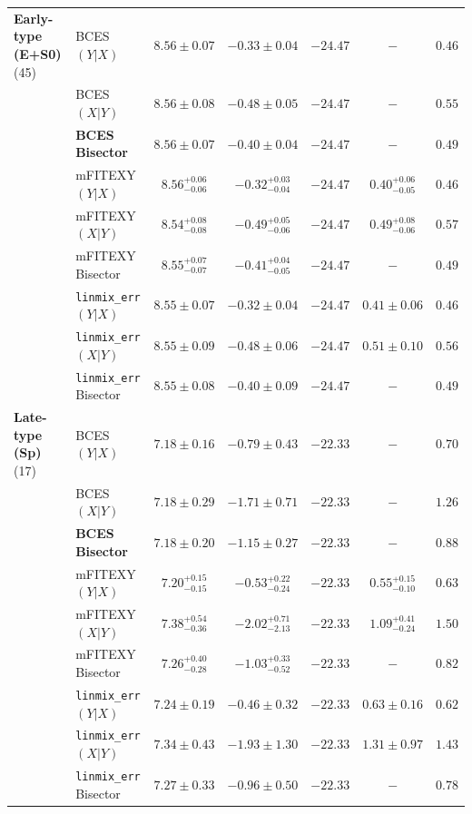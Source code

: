 \documentclass[preprint2]{emulateapj}
\begin{document}
\begin{table}
\begin{tabular}{llccccc}
{\bf Early-type (E+S0)} (45) & BCES $(Y|X)$    & $8.56 \pm 0.07$ & $-0.33 \pm 0.04$ & $-24.47$ & $-$    & $0.46$ \\
                             & BCES $(X|Y)$    & $8.56 \pm 0.08$ & $-0.48 \pm 0.05$ & $-24.47$ & $-$    & $0.55$ \\
                             & {\bf BCES Bisector}& $\boldsymbol{8.56 \pm 0.07}$ & $\boldsymbol{-0.40 \pm 0.04}$ & $\boldsymbol{-24.47}$ & $-$    & $\boldsymbol{0.49}$ \\
                             & mFITEXY $(Y|X)$ & $8.56^{+0.06}_{-0.06}$ & $-0.32^{+0.03}_{-0.04}$ & $-24.47$ & $0.40^{+0.06}_{-0.05}$ & $0.46$ \\
                             & mFITEXY $(X|Y)$ & $8.54^{+0.08}_{-0.08}$ & $-0.49^{+0.05}_{-0.06}$ & $-24.47$ & $0.49^{+0.08}_{-0.06}$ & $0.57$\\
                             & mFITEXY Bisector   & $8.55^{+0.07}_{-0.07}$ & $-0.41^{+0.04}_{-0.05}$ & $-24.47$ & $-$    & $0.49$ \\
                             & {\tt linmix\_err} $(Y|X)$  & $8.55 \pm 0.07$ & $-0.32 \pm 0.04$ & $-24.47$ & $0.41 \pm 0.06$ & $0.46$ \\
                             & {\tt linmix\_err} $(X|Y)$  & $8.55 \pm 0.09$ & $-0.48 \pm 0.06$ & $-24.47$ & $0.51 \pm 0.10$ & $0.56$ \\
                             & {\tt linmix\_err} Bisector    & $8.55 \pm 0.08$ & $-0.40 \pm 0.09$ & $-24.47$ & $-$    & $0.49$ \\ [0.5em]

{\bf Late-type (Sp)} (17) & BCES $(Y|X)$    & $7.18 \pm 0.16$ & $-0.79 \pm 0.43$ & $-22.33$ & $-$    & $0.70$ \\
                          & BCES $(X|Y)$    & $7.18 \pm 0.29$ & $-1.71 \pm 0.71$ & $-22.33$ & $-$    & $1.26$ \\
                          & {\bf BCES Bisector}& $\boldsymbol{7.18 \pm 0.20}$ & $\boldsymbol{-1.15 \pm 0.27}$ & $\boldsymbol{-22.33}$ & $-$    & $\boldsymbol{0.88}$ \\
                          & mFITEXY $(Y|X)$    & $7.20^{+0.15}_{-0.15}$ & $-0.53^{+0.22}_{-0.24}$ & $-22.33$ & $0.55^{+0.15}_{-0.10}$ & $0.63$ \\
                          & mFITEXY $(X|Y)$    & $7.38^{+0.54}_{-0.36}$ & $-2.02^{+0.71}_{-2.13}$ & $-22.33$ & $1.09^{+0.41}_{-0.24}$ & $1.50$ \\
                          & mFITEXY Bisector   & $7.26^{+0.40}_{-0.28}$ & $-1.03^{+0.33}_{-0.52}$ & $-22.33$ & $-$    & $0.82$ \\
                          & {\tt linmix\_err} $(Y|X)$  & $7.24 \pm 0.19$ & $-0.46 \pm 0.32$ & $-22.33$ & $0.63 \pm 0.16$ & $0.62$ \\
                          & {\tt linmix\_err} $(X|Y)$  & $7.34 \pm 0.43$ & $-1.93 \pm 1.30$ & $-22.33$ & $1.31 \pm 0.97$ & $1.43$ \\
                          & {\tt linmix\_err} Bisector & $7.27 \pm 0.33$ & $-0.96 \pm 0.50$ & $-22.33$ & $-$    & $0.78$ \\


\end{tabular}
\end{table}
\end{document}
